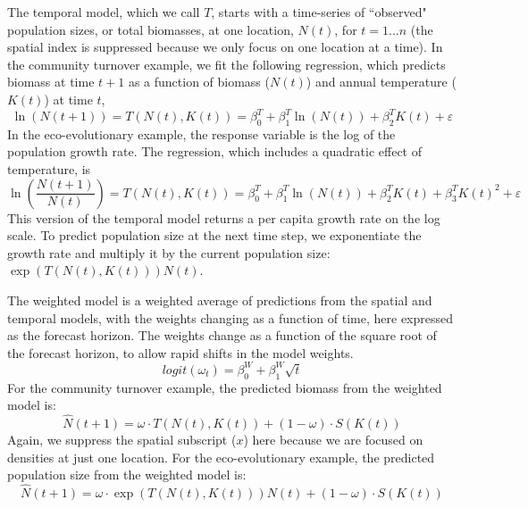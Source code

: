 \documentclass[11pt]{article}
\begin{document}
The temporal model, which we call $T$, starts with a time-series of ``observed" population sizes, or total biomasses, at one location, $N(t)$, for $t=1...n$ (the spatial index is suppressed because we only focus on one location at a time). In the community turnover example, we fit the following regression, which predicts biomass at time $t+1$ as a function of biomass ($N(t)$) and annual temperature ($K(t)$) at time $t$,
\begin{equation}
\ln(N(t+1)) = T(N(t),K(t)) = \beta^T_0 +  \beta^T_1 \ln(N(t)) +\beta^T_2 K(t)  +  \varepsilon
\label{eqn:temporal_regression_community1}
\end{equation}
In the eco-evolutionary example, the response variable is the log of the population growth rate. The regression, which includes a quadratic effect of temperature, is 
\begin{equation}
\ln\left(\frac{N(t+1)}{N(t)}\right) = T(N(t),K(t)) = \beta^T_0 +  \beta^T_1 \ln(N(t)) +\beta^T_2 K(t)  +\beta^T_3 K(t)^2 +  \varepsilon
\label{eqn:temporal_regression_ecoevo2}
\end{equation}
This version of the temporal model returns a per capita growth rate on the log scale. To predict population size at the next time step, we exponentiate the growth rate and multiply it by the current population size: $\exp(T(N(t),K(t))) N(t)$.

The weighted model is a weighted average of predictions from the spatial and temporal models, with the weights changing as a function of time, here expressed as the forecast horizon. The weights change as a function of the square root of the forecast horizon, to allow rapid shifts in the model weights. 
\begin{equation}
logit(\omega_t)=\beta^W_0 + \beta^W_1 \sqrt{t}
\label{eqn:weights}
\end{equation}
For the community turnover example, the predicted biomass from the weighted model is:
\begin{equation}
\hat{N}(t+1)= \omega \cdot T(N(t),K(t)) + (1-\omega) \cdot S(K(t)) 
\label{eqn:combined_model1}
\end{equation}
Again, we suppress the spatial subscript ($x$) here because we are focused on densities at just one location. For the eco-evolutionary example, the predicted population size from the weighted model is:
\begin{equation}
\hat{N}(t+1) = \omega \cdot \exp(T(N(t),K(t))) N(t) + (1-\omega) \cdot S(K(t)) 
\label{eqn:combined_model2}
\end{equation}
\end{document}
